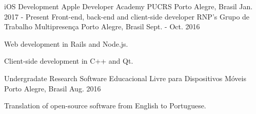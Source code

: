 \begin{cventries}
  \cventry
    {iOS Development}
    {Apple Developer Academy PUCRS}
    {Porto Alegre, Brasil}
    {Jan. 2017 - Present}
    {}
  \cventry
    {Front-end, back-end and client-side developer}
    {RNP's Grupo de Trabalho Multipresença}
    {Porto Alegre, Brasil}
    {Sept. - Oct. 2016}
    {
      \begin{cvitems}
        \item {Web development in Rails and Node.js.}
        \item {Client-side development in C++ and Qt.}
      \end{cvitems}
    }
  \cventry
    {Undergradate Research}
    {Software Educacional Livre para Dispositivos Móveis}
    {Porto Alegre, Brasil}
    {Aug. 2016}
    {
      \begin{cvitems}
        \item {Translation of open-source software from English to Portuguese.}
      \end{cvitems}
    }
\end{cventries}
